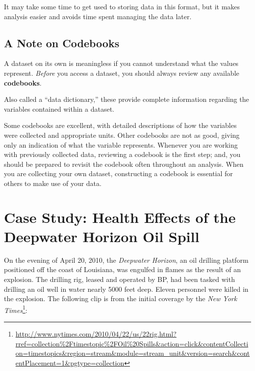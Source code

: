 \documentclass[]{book}
\let\rmarkdownfootnote\footnote%
\def\footnote{\protect\rmarkdownfootnote}
\theoremstyle{definition}
\theoremstyle{definition}
\theoremstyle{remark}
\let\BeginKnitrBlock\begin \let\EndKnitrBlock\end
\begin{document}
It may take some time to get used to storing data in this format, but it
makes analysis easier and avoids time spent managing the data later.

\section{A Note on Codebooks}\label{a-note-on-codebooks}

A dataset on its own is meaningless if you cannot understand what the
values represent. \emph{Before} you access a dataset, you should always
review any available \textbf{codebooks}.

\BeginKnitrBlock{definition}[Codebook]
\protect\hypertarget{def:defn-codebook}{}{\label{def:defn-codebook}
{} }Also called a ``data dictionary,'' these
provide complete information regarding the variables contained within a
dataset.
\EndKnitrBlock{definition}

Some codebooks are excellent, with detailed descriptions of how the
variables were collected and appropriate units. Other codebooks are not
as good, giving only an indication of what the variable represents.
Whenever you are working with previously collected data, reviewing a
codebook is the first step; and, you should be prepared to revisit the
codebook often throughout an analysis. When you are collecting your own
dataset, constructing a codebook is essential for others to make use of
your data.

\hypertarget{CaseDeepwater}{\chapter{Case Study: Health Effects of the
Deepwater Horizon Oil Spill}\label{CaseDeepwater}}

On the evening of April 20, 2010, the \emph{Deepwater Horizon}, an oil
drilling platform positioned off the coast of Louisiana, was engulfed in
flames as the result of an explosion. The drilling rig, leased and
operated by BP, had been tasked with drilling an oil well in water
nearly 5000 feet deep. Eleven personnel were killed in the explosion.
The following clip is from the initial coverage by the \emph{New York
Times}\footnote{\url{http://www.nytimes.com/2010/04/22/us/22rig.html?rref=collection\%2Ftimestopic\%2FOil\%20Spills\&action=click\&contentCollection=timestopics\&region=stream\&module=stream_unit\&version=search\&contentPlacement=1\&pgtype=collection}}:
\end{document}
